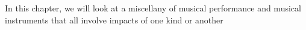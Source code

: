   In this chapter, we will look at a miscellany of musical performance and 
  musical instruments that all involve impacts of one kind or another 

